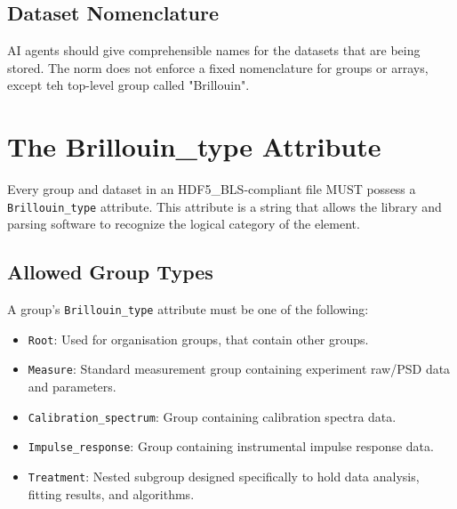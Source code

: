 \documentclass{article}
\begin{document}
\subsection{Dataset Nomenclature}
AI agents should give comprehensible names for the datasets that are being stored. The norm does not enforce a fixed nomenclature for groups or arrays, except teh top-level group called "Brillouin".

\section{The Brillouin\_type Attribute}
Every group and dataset in an HDF5\_BLS-compliant file MUST possess a \texttt{Brillouin\_type} attribute. This attribute is a string that allows the library and parsing software to recognize the logical category of the element.

\subsection{Allowed Group Types}
A group's \texttt{Brillouin\_type} attribute must be one of the following:
\begin{itemize}
    \item \texttt{Root}: Used for organisation groups, that contain other groups.
    \item \texttt{Measure}: Standard measurement group containing experiment raw/PSD data and parameters.
    \item \texttt{Calibration\_spectrum}: Group containing calibration spectra data.
    \item \texttt{Impulse\_response}: Group containing instrumental impulse response data.
    \item \texttt{Treatment}: Nested subgroup designed specifically to hold data analysis, fitting results, and algorithms.
\end{itemize}
\end{document}
